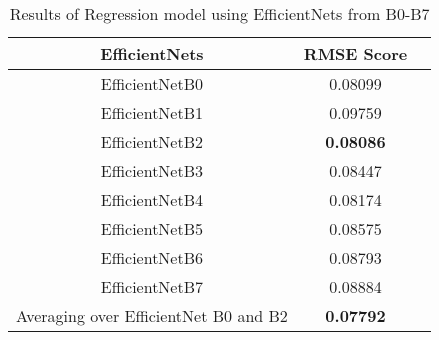 \begin{table}
    \centering
    \begin{tabular}{c | c c}
        \hline
        \hline
        \multirow{1}{*}{EfficientNets} & 
            \multicolumn{1}{c}{RMSE Score} \\
        \hline
        EfficientNetB0 & 0.08099  \\
        EfficientNetB1 & 0.09759  \\
        EfficientNetB2 & \textbf{0.08086}  \\
        EfficientNetB3 & 0.08447  \\
        EfficientNetB4 & 0.08174  \\
        EfficientNetB5 & 0.08575  \\
        EfficientNetB6 & 0.08793  \\
        EfficientNetB7 & 0.08884  \\
        Averaging over EfficientNet B0 and B2 & \textbf{0.07792} \\
        \hline
    \end{tabular}
    \caption{Results of Regression model using EfficientNets from B0-B7}
    \label{tab: regression_results}
\end{table}